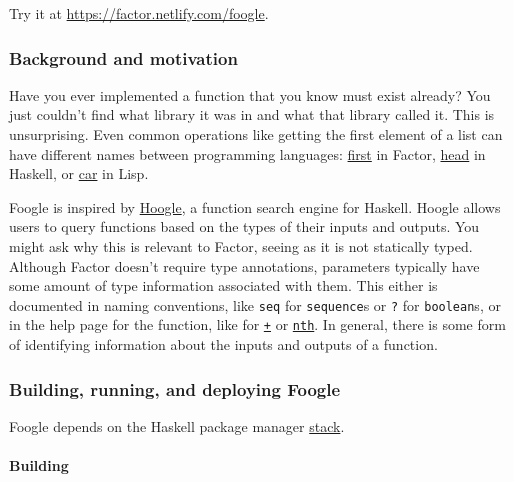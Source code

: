 \documentclass[
]{article}
\begin{document}
Try it at \url{https://factor.netlify.com/foogle}.

\hypertarget{background-and-motivation}{%
\subsubsection{Background and
motivation}\label{background-and-motivation}}

Have you ever implemented a function that you know must exist already?
You just couldn't find what library it was in and what that library
called it. This is unsurprising. Even common operations like getting the
first element of a list can have different names between programming
languages:
\href{https://docs.factorcode.org/content/word-first,sequences.html}{first}
in Factor,
\href{https://hackage.haskell.org/package/base-4.12.0.0/docs/Data-List.html\#v:head}{head}
in Haskell, or
\href{https://www.gnu.org/software/emacs/manual/html_node/eintr/car-_0026-cdr.html}{car}
in Lisp.

Foogle is inspired by \href{https://hoogle.haskell.org/}{Hoogle}, a
function search engine for Haskell. Hoogle allows users to query
functions based on the types of their inputs and outputs. You might ask
why this is relevant to Factor, seeing as it is not statically typed.
Although Factor doesn't require type annotations, parameters typically
have some amount of type information associated with them. This either
is documented in naming conventions, like \texttt{seq} for
\texttt{sequence}s or \texttt{?} for \texttt{boolean}s, or in the help
page for the function, like for
\href{https://docs.factorcode.org/content/word-+,math.html}{\texttt{+}}
or
\href{https://docs.factorcode.org/content/word-nth\%2Csequences.html}{\texttt{nth}}.
In general, there is some form of identifying information about the
inputs and outputs of a function.

\hypertarget{building-running-and-deploying-foogle}{%
\subsubsection{Building, running, and deploying
Foogle}\label{building-running-and-deploying-foogle}}

Foogle depends on the Haskell package manager
\href{https://docs.haskellstack.org/en/stable/README/}{stack}.

\hypertarget{building}{%
\paragraph{Building}\label{building}}
\end{document}
